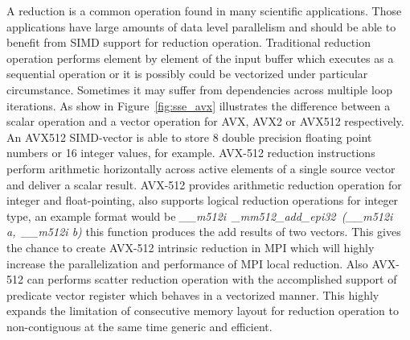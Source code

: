 \documentclass[sigconf]{acmart}
\newcommand{\mpi}[0]{\textsc{MPI}\xspace}
\begin{document}
A reduction is a common operation found in many scientific applications.
Those applications have large amounts of data level parallelism and should be able
to benefit from SIMD support for reduction operation.
Traditional reduction operation performs element by element of the input buffer
which executes as a sequential operation or it is possibly could be vectorized
under particular circumstance. Sometimes it may suffer from dependencies across
multiple loop iterations.
As show in Figure~\ref{fig:sse_avx} illustrates the difference between a scalar operation and
a vector operation for AVX, AVX2 or AVX512 respectively. An AVX512 SIMD-vector is able to store 8 double precision floating point numbers or 16 integer values, for example.
AVX-512 reduction instructions perform arithmetic horizontally across active elements of a
single source vector and deliver a scalar result. AVX-512 provides arithmetic
reduction operation for integer and float-pointing, also supports logical reduction
operations for integer type, an example format would be
\emph{\textit{\_\_m512i\ \_mm512\_add\_epi32\ (\_\_m512i a,\ \_\_m512i b)}}
this function produces the add results of two vectors.
This gives the chance to create AVX-512 intrinsic reduction in \mpi which
will highly increase the parallelization and performance of \mpi local reduction.
Also AVX-512 can performs scatter reduction operation with the accomplished
support of predicate vector register which behaves in a vectorized manner. This highly
expands the limitation of consecutive memory layout for reduction operation to non-contiguous
at the same time generic and efficient.
\end{document}
